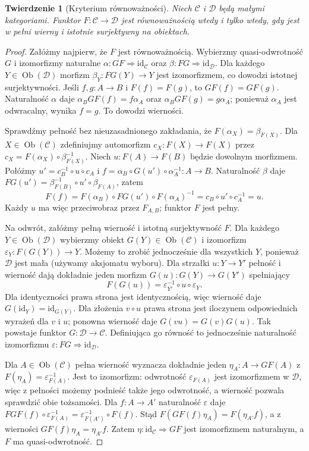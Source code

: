 \documentclass[11pt,a4paper]{article}
\numberwithin{equation}{section}
\theoremstyle{plain}
\newtheorem{twierdzenie}{Twierdzenie}[section]
\theoremstyle{definition}
\theoremstyle{remark}
\newcommand{\id}{\mathrm{id}}
\newcommand{\Ob}{\operatorname{Ob}}
\begin{document}
\begin{twierdzenie}[Kryterium równoważności]\label{tw:equivalence}
Niech $\mathcal C$ i $\mathcal D$ będą małymi kategoriami. Funktor $F:\mathcal C\to\mathcal D$ jest równoważnością wtedy i tylko wtedy, gdy jest w pełni wierny i istotnie surjektywny na obiektach.
\end{twierdzenie}
\begin{proof}
Załóżmy najpierw, że $F$ jest równoważnością. Wybierzmy quasi-odwrotność $G$ i izomorfizmy naturalne $\alpha:GF\Rightarrow\id_{\mathcal C}$ oraz $\beta:FG\Rightarrow\id_{\mathcal D}$. Dla każdego $Y\in\Ob(\mathcal D)$ morfizm $\beta_Y:FG(Y)\to Y$ jest izomorfizmem, co dowodzi istotnej surjektywności. Jeśli $f,g:A\to B$ i $F(f)=F(g)$, to $GF(f)=GF(g)$. Naturalność $\alpha$ daje $\alpha_BGF(f)=f\alpha_A$ oraz $\alpha_BGF(g)=g\alpha_A$; ponieważ $\alpha_A$ jest odwracalny, wynika $f=g$. To dowodzi wierności.

Sprawdźmy pełność bez nieuzasadnionego zakładania, że $F(\alpha_X)=\beta_{F(X)}$. Dla $X\in\Ob(\mathcal C)$ zdefiniujmy automorfizm $c_X:F(X)\to F(X)$ przez $c_X=F(\alpha_X)\circ\beta_{F(X)}^{-1}$. Niech $u:F(A)\to F(B)$ będzie dowolnym morfizmem. Połóżmy $u'=c_B^{-1}\circ u\circ c_A$ i $f=\alpha_B\circ G(u')\circ\alpha_A^{-1}:A\to B$. Naturalność $\beta$ daje
$FG(u')=\beta_{F(B)}^{-1}\circ u'\circ\beta_{F(A)}$, zatem
\[
F(f)=F(\alpha_B)\circ FG(u')\circ F(\alpha_A)^{-1}
=c_B\circ u'\circ c_A^{-1}=u.
\]
Każdy $u$ ma więc przeciwobraz przez $F_{A,B}$; funktor $F$ jest pełny.

Na odwrót, załóżmy pełną wierność i istotną surjektywność $F$. Dla każdego $Y\in\Ob(\mathcal D)$ wybierzmy obiekt $G(Y)\in\Ob(\mathcal C)$ i izomorfizm $\varepsilon_Y:F(G(Y))\to Y$. Możemy to zrobić jednocześnie dla wszystkich $Y$, ponieważ $\mathcal D$ jest mała (używamy aksjomatu wyboru). Dla strzałki $u:Y\to Y'$ pełność i wierność dają dokładnie jeden morfizm $G(u):G(Y)\to G(Y')$ spełniający
\[
F(G(u))=\varepsilon_{Y'}^{-1}\circ u\circ\varepsilon_Y.
\]
Dla identyczności prawa strona jest identycznością, więc wierność daje $G(\id_Y)=\id_{G(Y)}$. Dla złożenia $v\circ u$ prawa strona jest iloczynem odpowiednich wyrażeń dla $v$ i $u$; ponowna wierność daje $G(vu)=G(v)G(u)$. Tak powstaje funktor $G:\mathcal D\to\mathcal C$. Definiująca go równość to jednocześnie naturalność izomorfizmu $\varepsilon:FG\Rightarrow\id_{\mathcal D}$.

Dla $A\in\Ob(\mathcal C)$ pełna wierność wyznacza dokładnie jeden $\eta_A:A\to GF(A)$ z $F(\eta_A)=\varepsilon_{F(A)}^{-1}$. Jest to izomorfizm: odwrotność $\varepsilon_{F(A)}$ jest izomorfizmem w $\mathcal D$, więc z pełności możemy podnieść także jego odwrotność, a wierność pozwala sprawdzić obie tożsamości. Dla $f:A\to A'$ naturalność $\varepsilon$ daje
$FGF(f)\circ\varepsilon_{F(A)}^{-1}=\varepsilon_{F(A')}^{-1}\circ F(f)$. Stąd
$F(GF(f)\eta_A)=F(\eta_{A'}f)$, a z wierności $GF(f)\eta_A=\eta_{A'}f$. Zatem $\eta:\id_{\mathcal C}\Rightarrow GF$ jest izomorfizmem naturalnym, a $F$ ma quasi-odwrotność.
\end{proof}
\end{document}
